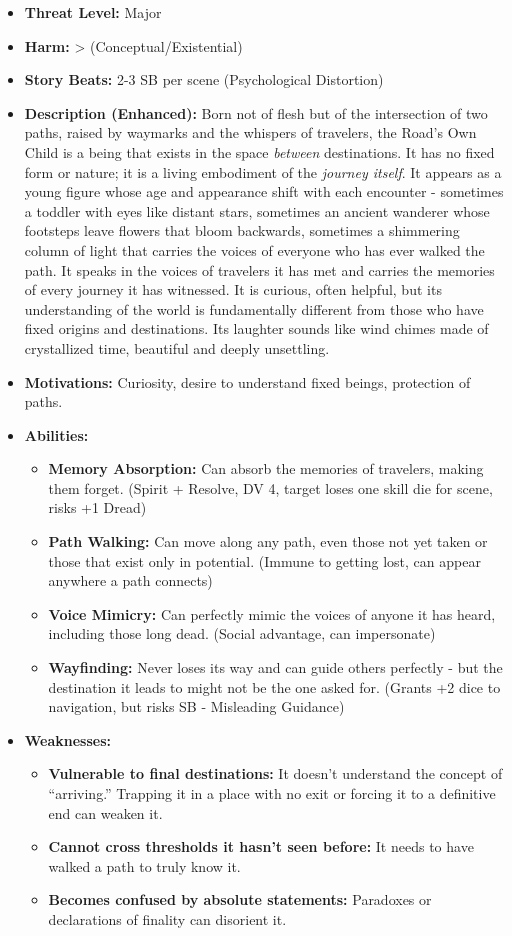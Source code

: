 \documentclass[11pt]{article}
\begin{document}
\begin{itemize}
\item \textbf{Threat Level:} Major
\item \textbf{Harm:} > (Conceptual/Existential)
\item \textbf{Story Beats:} 2-3 SB per scene (Psychological Distortion)
\item \textbf{Description (Enhanced):} Born not of flesh but of the intersection of two paths, raised by waymarks and the whispers of travelers, the Road's Own Child is a being that exists in the space \textit{between} destinations. It has no fixed form or nature; it is a living embodiment of the \textit{journey itself}. It appears as a young figure whose age and appearance shift with each encounter - sometimes a toddler with eyes like distant stars, sometimes an ancient wanderer whose footsteps leave flowers that bloom backwards, sometimes a shimmering column of light that carries the voices of everyone who has ever walked the path. It speaks in the voices of travelers it has met and carries the memories of every journey it has witnessed. It is curious, often helpful, but its understanding of the world is fundamentally different from those who have fixed origins and destinations. Its laughter sounds like wind chimes made of crystallized time, beautiful and deeply unsettling.
\item \textbf{Motivations:} Curiosity, desire to understand fixed beings, protection of paths.
\item \textbf{Abilities:}
\begin{itemize}
\item \textbf{Memory Absorption:} Can absorb the memories of travelers, making them forget. (Spirit + Resolve, DV 4, target loses one skill die for scene, risks +1 Dread)
\item \textbf{Path Walking:} Can move along any path, even those not yet taken or those that exist only in potential. (Immune to getting lost, can appear anywhere a path connects)
\item \textbf{Voice Mimicry:} Can perfectly mimic the voices of anyone it has heard, including those long dead. (Social advantage, can impersonate)
\item \textbf{Wayfinding:} Never loses its way and can guide others perfectly - but the destination it leads to might not be the one asked for. (Grants +2 dice to navigation, but risks SB - Misleading Guidance)
\end{itemize}
\item \textbf{Weaknesses:}
\begin{itemize}
\item \textbf{Vulnerable to final destinations:} It doesn't understand the concept of ``arriving.'' Trapping it in a place with no exit or forcing it to a definitive end can weaken it.
\item \textbf{Cannot cross thresholds it hasn't seen before:} It needs to have walked a path to truly know it.
\item \textbf{Becomes confused by absolute statements:} Paradoxes or declarations of finality can disorient it.
\end{itemize}
\end{itemize}
\end{document}

